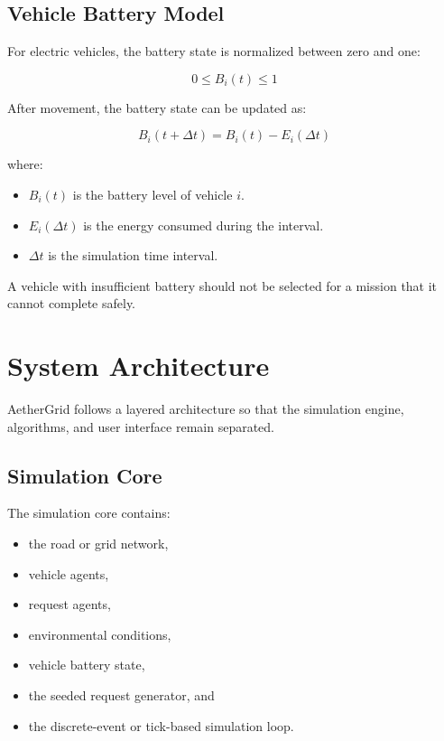 \documentclass[12pt,a4paper]{article}
\begin{document}
\subsection{Vehicle Battery Model}

For electric vehicles, the battery state is normalized between zero
and one:

\begin{equation}
    0
    \leq
    B_i(t)
    \leq
    1
    \label{eq:battery}
\end{equation}

After movement, the battery state can be updated as:

\begin{equation}
    B_i(t+\Delta t)
    =
    B_i(t)
    -
    E_i(\Delta t)
    \label{eq:batteryupdate}
\end{equation}

where:

\begin{itemize}
    \item $B_i(t)$ is the battery level of vehicle $i$.
    \item $E_i(\Delta t)$ is the energy consumed during the interval.
    \item $\Delta t$ is the simulation time interval.
\end{itemize}

A vehicle with insufficient battery should not be selected for a
mission that it cannot complete safely.





\section{System Architecture}

AetherGrid follows a layered architecture so that the simulation
engine, algorithms, and user interface remain separated.

\subsection{Simulation Core}

The simulation core contains:

\begin{itemize}
    \item the road or grid network,
    \item vehicle agents,
    \item request agents,
    \item environmental conditions,
    \item vehicle battery state,
    \item the seeded request generator, and
    \item the discrete-event or tick-based simulation loop.
\end{itemize}
\end{document}

